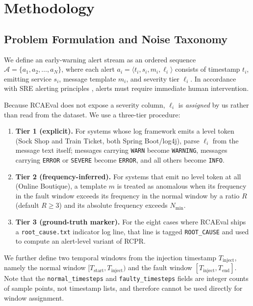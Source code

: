 \documentclass[conference]{IEEEtran}
\begin{document}
\section{Methodology}
\subsection{Problem Formulation and Noise Taxonomy}
We define an early-warning alert stream as an ordered sequence $\mathcal{A} = \{a_1, a_2, \dots, a_N\}$, where each alert $a_i = \langle t_i, s_i, m_i, \ell_i \rangle$ consists of timestamp $t_i$, emitting service $s_i$, message template $m_i$, and severity tier $\ell_i$. In accordance with SRE alerting principles \cite{google-sre-book, google-sre-ch10, google-sre-ch11}, alerts must require immediate human intervention.

Because RCAEval does not expose a severity column, $\ell_i$ is \emph{assigned} by us rather than read from the dataset. We use a three-tier procedure:
\begin{enumerate}
    \item \textbf{Tier 1 (explicit).} For systems whose log framework emits a level token (Sock Shop and Train Ticket, both Spring Boot/log4j), parse $\ell_i$ from the message text itself; messages carrying \texttt{WARN} become \texttt{WARNING}, messages carrying \texttt{ERROR} or \texttt{SEVERE} become \texttt{ERROR}, and all others become \texttt{INFO}.
    \item \textbf{Tier 2 (frequency-inferred).} For systems that emit no level token at all (Online Boutique), a template $m$ is treated as anomalous when its frequency in the fault window exceeds its frequency in the normal window by a ratio $R$ (default $R \ge 3$) and its absolute frequency exceeds $N_{\min}$.
    \item \textbf{Tier 3 (ground-truth marker).} For the eight cases where RCAEval ships a \texttt{root\_cause.txt} indicator log line, that line is tagged \texttt{ROOT\_CAUSE} and used to compute an alert-level variant of RCPR.
\end{enumerate}

We further define two temporal windows from the injection timestamp $T_{\text{inject}}$, namely the normal window $[T_{\text{start}}, T_{\text{inject}})$ and the fault window $[T_{\text{inject}}, T_{\text{end}}]$. Note that the \texttt{normal\_timesteps} and \texttt{faulty\_timesteps} fields are integer counts of sample points, not timestamp lists, and therefore cannot be used directly for window assignment.
\end{document}
